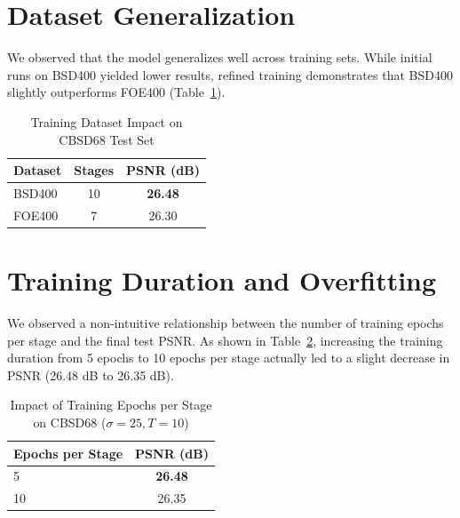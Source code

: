 \documentclass[11pt]{article}
\begin{document}
\section{Dataset Generalization}

We observed that the model generalizes well across training sets. While initial runs on BSD400 yielded lower results, refined training demonstrates that BSD400 slightly outperforms FOE400 (Table~\ref{tab:dataset_ablation}).

\begin{table}[h]
	\centering
	\caption{Training Dataset Impact on CBSD68 Test Set}
	\label{tab:dataset_ablation}
	\begin{tabular}{l c c}
		\toprule
		Dataset & Stages & PSNR (dB)      \\
		\midrule
		BSD400  & 10     & \textbf{26.48} \\
		FOE400  & 7      & 26.30          \\
		\bottomrule
	\end{tabular}
\end{table}

\section{Training Duration and Overfitting}

We observed a non-intuitive relationship between the number of training epochs per stage and the final test PSNR. As shown in Table~\ref{tab:epoch_ablation}, increasing the training duration from 5 epochs to 10 epochs per stage actually led to a slight decrease in PSNR (26.48 dB to 26.35 dB).

\begin{table}[h]
	\centering
	\caption{Impact of Training Epochs per Stage on CBSD68 ($\sigma=25, T=10$)}
	\label{tab:epoch_ablation}
	\begin{tabular}{l c}
		\toprule
		Epochs per Stage & PSNR (dB)      \\
		\midrule
		5               & \textbf{26.48} \\
		10              & 26.35          \\
		\bottomrule
	\end{tabular}
\end{table}
\end{document}
